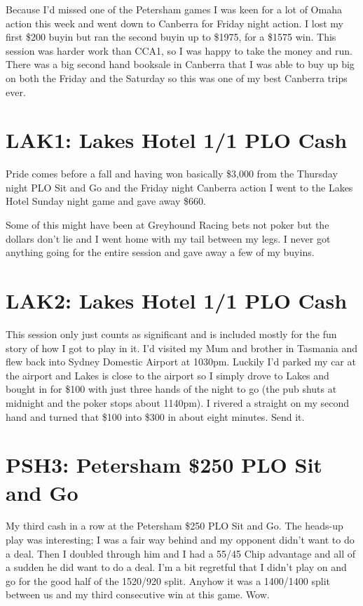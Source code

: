 Because I'd missed one of the Petersham games I was keen for a lot of
Omaha action this week and went down to Canberra for Friday night
action. I lost my first \$200 buyin but ran the second buyin up to
\$1975, for a \$1575 win. This session was harder work than CCA1, so I
was happy to take the money and run. There was a big second hand
booksale in Canberra that I was able to buy up big on both the Friday
and the Saturday so this was one of my best Canberra trips ever.

\section*{LAK1: Lakes Hotel 1/1 PLO Cash}

Pride comes before a fall and having won basically \$3,000 from the
Thursday night PLO Sit and Go and the Friday night Canberra action I
went to the Lakes Hotel Sunday night game and gave away \$660.

Some of this might have been at Greyhound Racing bets not poker but
the dollars don't lie and I went home with my tail between my legs. I
never got anything going for the entire session and gave away a few of
my buyins.

\section*{LAK2: Lakes Hotel 1/1 PLO Cash}

This session only just counts as significant and is included mostly
for the fun story of how I got to play in it. I'd visited my Mum and
brother in Tasmania and flew back into Sydney Domestic Airport at
1030pm. Luckily I'd parked my car at the airport and Lakes is close to
the airport so I simply drove to Lakes and bought in for \$100 with
just three hands of the night to go (the pub shuts at midnight and the
poker stops about 1140pm). I rivered a straight on my second hand and
turned that \$100 into \$300 in about eight minutes. Send it.

\section*{PSH3: Petersham \$250 PLO Sit and Go}

My third cash in a row at the Petersham \$250 PLO Sit and Go. The
heads-up play was interesting; I was a fair way behind and my opponent
didn't want to do a deal. Then I doubled through him and I had a 55/45
Chip advantage and all of a sudden he did want to do a deal. I'm a bit
regretful that I didn't play on and go for the good half of the
1520/920 split. Anyhow it was a 1400/1400 split between us and my
third consecutive win at this game. Wow.

